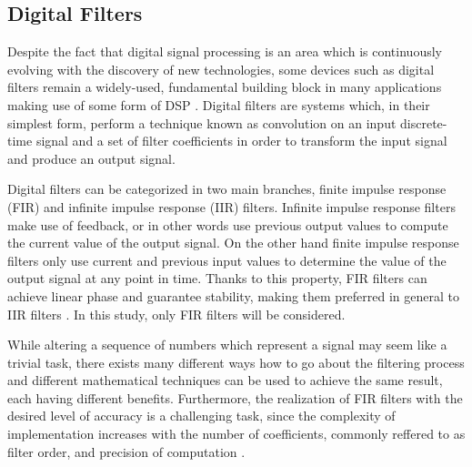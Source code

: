 \documentclass{csfyp}
\begin{document}
\subsection{Digital Filters}
Despite the fact that digital signal processing is an area which is continuously evolving with the discovery of new technologies, some devices such as digital filters remain a widely-used, fundamental building block in many applications making use of some form of DSP \cite{daitx2008vhdl}. Digital filters are systems which, in their simplest form, perform a technique known as convolution on an input discrete-time signal and a set of filter coefficients in order to transform the input signal and produce an output signal.

Digital filters can be categorized in two main branches, finite impulse response (FIR) and infinite impulse response (IIR) filters. Infinite impulse response filters make use of feedback, or in other words use previous output values to compute the current value of the output signal. On the other hand finite impulse response filters only use current and previous input values to determine the value of the output signal at any point in time. Thanks to this property, FIR filters can achieve linear phase and guarantee stability, making them preferred in general to IIR filters \cite{rosa2006vhdl}. In this study, only FIR filters will be considered.

While altering a sequence of numbers which represent a signal may seem like a trivial task, there exists many different ways how to go about the filtering process and different mathematical techniques can be used to achieve the same result, each having different benefits. Furthermore, the realization of FIR filters with the desired level of accuracy is a challenging task, since the complexity of implementation increases with the number of coefficients, commonly reffered to as filter order, and precision of computation \cite{meher2008fpga}.
\end{document}
